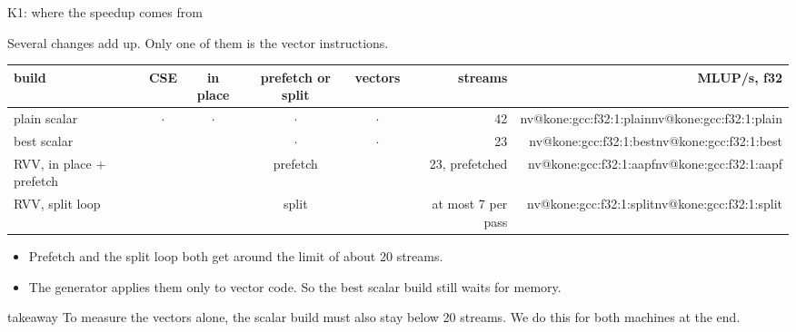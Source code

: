 \documentclass[aspectratio=169,10pt,t]{beamer}
\makeatletter
\newcommand{\nv}[1]{\ifcsname nv@#1\endcsname\csname nv@#1\endcsname\else
  \errmessage{presentation7: unknown number '#1' (see tables/numbers.tex)}\fi}
\newcommand{\yes}{\textcolor{psteal}{\ding{51}}}
\newcommand{\no}{\textcolor{psgray!70}{$\cdot$}}
\newcommand{\takeaway}[1]{\par\vfill
  \begin{beamercolorbox}[wd=\textwidth,sep=4pt,rounded=true]{takeaway}
    \small #1
  \end{beamercolorbox}}
\makeatother
\begin{document}
\begin{frame}{K1: where the speedup comes from}
  \vspace{1mm}
  {\small Several changes add up. Only one of them is the vector instructions.\par}
  \vspace{2mm}
  \centering
  {\footnotesize\renewcommand{\arraystretch}{1.15}
  \begin{tabular}{@{}lccccrr@{}}
    \toprule
    \textbf{build} & \textbf{CSE} & \textbf{in place} & \textbf{prefetch or split} & \textbf{vectors}
      & \textbf{streams} & \textbf{MLUP/s, f32}\\
    \midrule
    plain scalar & \no & \no & \no & \no & 42 & \nv{kone:gcc:f32:1:plain}\\
    best scalar & \yes & \yes & \no & \no & 23 & \nv{kone:gcc:f32:1:best}\\
    RVV, in place + prefetch & \yes & \yes & prefetch & \yes & 23, prefetched & \nv{kone:gcc:f32:1:aapf}\\
    RVV, split loop & \yes & \yes & split & \yes & at most 7 per pass & \nv{kone:gcc:f32:1:split}\\
    \bottomrule
  \end{tabular}\par}
  \vspace{3mm}
  \raggedright
  \begin{itemize}\small
    \item Prefetch and the split loop both get around the limit of about 20 streams.
    \item The generator applies them only to vector code. So the best scalar build still waits for memory.
  \end{itemize}
  \takeaway{To measure the vectors alone, the scalar build must also stay below 20 streams.
    We do this for both machines at the end.}
\end{frame}
\end{document}
